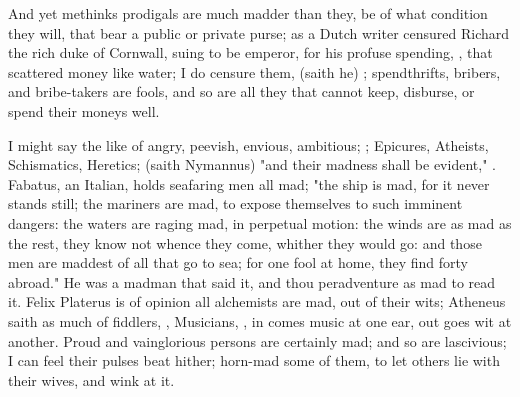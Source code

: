 
And yet methinks prodigals are much madder than they, be of what condition they
will, that bear a public or private purse; as a Dutch
writer censured Richard the rich duke of Cornwall, suing to be emperor, for his
profuse spending, , that scattered money like water; I do censure them,  (saith he) ; spendthrifts, bribers,
and bribe-takers are fools, and so are all they that cannot
keep, disburse, or spend their moneys well.

I might say the like of angry, peevish, envious, ambitious;
; Epicures, Atheists,
Schismatics, Heretics;  (saith
Nymannus) "and their madness shall be evident," .
Fabatus, an Italian, holds seafaring men all mad; "the ship
is mad, for it never stands still; the mariners are mad, to expose themselves
to such imminent dangers: the waters are raging mad, in perpetual motion: the
winds are as mad as the rest, they know not whence they come, whither they
would go: and those men are maddest of all that go to sea; for one fool at
home, they find forty abroad." He was a madman that said it, and thou
peradventure as mad to read it. Felix Platerus is of
opinion all alchemists are mad, out of their wits; Atheneus
saith as much of fiddlers, ,
Musicians, , in comes music at one ear, out goes wit at
another. Proud and vainglorious persons are certainly mad; and so are
lascivious; I can feel their pulses beat hither; horn-mad
some of them, to let others lie with their wives, and wink at it.

